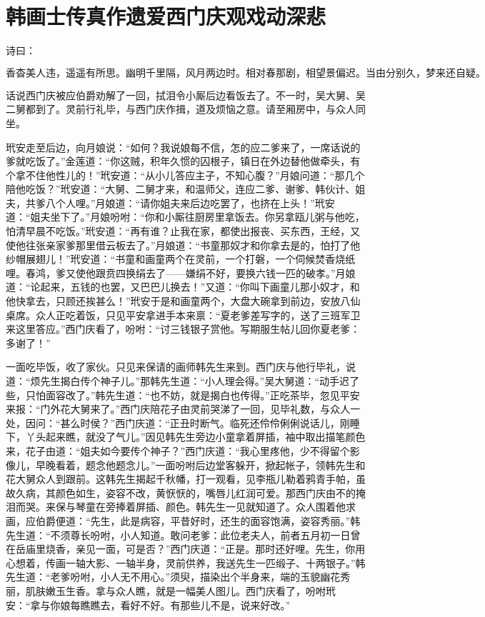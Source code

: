 

\chapter{韩画士传真作遗爱\KG 西门庆观戏动深悲}


诗曰：

\[
香杳美人违，遥遥有所思。幽明千里隔，风月两边时。
相对春那剧，相望景偏迟。当由分别久，梦来还自疑。
\]

话说西门庆被应伯爵劝解了一回，拭泪令小厮后边看饭去了。不一时，吴大舅、吴二舅都到了。灵前行礼毕，与西门庆作揖，道及烦恼之意。请至厢房中，与众人同坐。

玳安走至后边，向月娘说：“如何？我说娘每不信，怎的应二爹来了，一席话说的爹就吃饭了。”金莲道：“你这贼，积年久惯的囚根子，镇日在外边替他做牵头，有个拿不住他性儿的！”玳安道：“从小儿答应主子，不知心腹？”月娘问道：“那几个陪他吃饭？”玳安道：“大舅、二舅才来，和温师父，连应二爹、谢爹、韩伙计、姐夫，共爹八个人哩。”月娘道：“请你姐夫来后边吃罢了，也挤在上头！”玳安道：“姐夫坐下了。”月娘吩咐：“你和小厮往厨房里拿饭去。你另拿瓯儿粥与他吃，怕清早晨不吃饭。”玳安道：“再有谁？止我在家，都使出报丧、买东西，王经，又使他往张亲家爹那里借云板去了。”月娘道：“书童那奴才和你拿去是的，怕打了他纱帽展翅儿！”玳安道：“书童和画童两个在灵前，一个打磐，一个伺候焚香烧纸哩。春鸿，爹又使他跟贲四换绢去了——嫌绢不好，要换六钱一匹的破孝。”月娘道：“论起来，五钱的也罢，又巴巴儿换去！”又道：“你叫下画童儿那小奴才，和他快拿去，只顾还挨甚么！”玳安于是和画童两个，大盘大碗拿到前边，安放八仙桌席。众人正吃着饭，只见平安拿进手本来禀：“夏老爹差写字的，送了三班军卫来这里答应。”西门庆看了，吩咐：“讨三钱银子赏他。写期服生帖儿回你夏老爹：多谢了！”

一面吃毕饭，收了家伙。只见来保请的画师韩先生来到。西门庆与他行毕礼，说道：“烦先生揭白传个神子儿。”那韩先生道：“小人理会得。”吴大舅道：“动手迟了些，只怕面容改了。”韩先生道：“也不妨，就是揭白也传得。”正吃茶毕，忽见平安来报：“门外花大舅来了。”西门庆陪花子由灵前哭涕了一回，见毕礼数，与众人一处，因问：“甚么时侯？”西门庆道：“正丑时断气。临死还伶伶俐俐说话儿，刚睡下，丫头起来瞧，就没了气儿。”因见韩先生旁边小童拿着屏插，袖中取出描笔颜色来，花子由道：“姐夫如今要传个神子？”西门庆道：“我心里疼他，少不得留个影像儿，早晚看着，题念他题念儿。”一面吩咐后边堂客躲开，掀起帐子，领韩先生和花大舅众人到跟前。这韩先生揭起千秋幡，打一观看，见李瓶儿勒着鸦青手帕，虽故久病，其颜色如生，姿容不改，黄恹恹的，嘴唇儿红润可爱。那西门庆由不的掩泪而哭。来保与琴童在旁捧着屏插、颜色。韩先生一见就知道了。众人围着他求画，应伯爵便道：“先生，此是病容，平昔好时，还生的面容饱满，姿容秀丽。”韩先生道：“不须尊长吩咐，小人知道。敢问老爹：此位老夫人，前者五月初一日曾在岳庙里烧香，亲见一面，可是否？”西门庆道：“正是。那时还好哩。先生，你用心想着，传画一轴大影、一轴半身，灵前供养，我送先生一匹缎子、十两银子。”韩先生道：“老爹吩咐，小人无不用心。”须臾，描染出个半身来，端的玉貌幽花秀丽，肌肤嫩玉生香。拿与众人瞧，就是一幅美人图儿。西门庆看了，吩咐玳安：“拿与你娘每瞧瞧去，看好不好。有那些儿不是，说来好改。”

